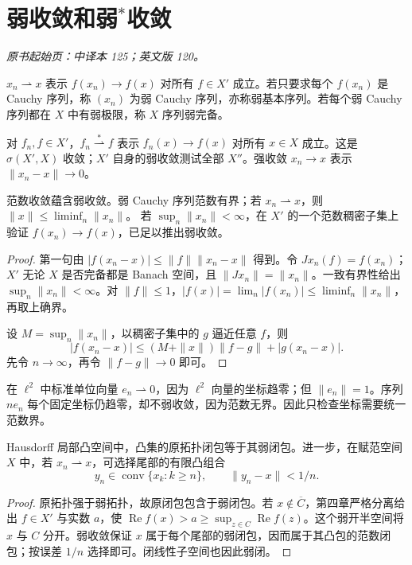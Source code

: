 \section{弱收敛和弱\texorpdfstring{$^*$}{*}收敛}\label{sec:yosida-05-01}
\noindent\textit{原书起始页：中译本 125；英文版 120。}

\begin{definition}[三种测试方式]
$x_n\rightharpoonup x$ 表示 $f(x_n)\to f(x)$ 对所有 $f\in X'$ 成立。若只要求每个 $f(x_n)$ 是 Cauchy 序列，称 $(x_n)$ 为弱 Cauchy 序列，亦称弱基本序列。若每个弱 Cauchy 序列都在 $X$ 中有弱极限，称 $X$ 序列弱完备。

对 $f_n,f\in X'$，$f_n\overset{*}{\rightharpoonup}f$ 表示 $f_n(x)\to f(x)$ 对所有 $x\in X$ 成立。这是 $\sigma(X',X)$ 收敛；$X'$ 自身的弱收敛测试全部 $X''$。强收敛 $x_n\to x$ 表示 $\|x_n-x\|\to0$。
\end{definition}

\begin{theorem}\label{thm:y5-weak-basic}
范数收敛蕴含弱收敛。弱 Cauchy 序列范数有界；若 $x_n\rightharpoonup x$，则 $\|x\|\le\liminf_n\|x_n\|$。
若 $\sup_n\|x_n\|<\infty$，在 $X'$ 的一个范数稠密子集上验证 $f(x_n)\to f(x)$，已足以推出弱收敛。
\end{theorem}
\begin{proof}
第一句由 $|f(x_n-x)|\le\|f\|\|x_n-x\|$ 得到。令 $Jx_n(f)=f(x_n)$；$X'$ 无论 $X$ 是否完备都是 Banach 空间，且 $\|Jx_n\|=\|x_n\|$。一致有界性给出 $\sup_n\|x_n\|<\infty$。对 $\|f\|\le1$，$|f(x)|=\lim_n|f(x_n)|\le\liminf_n\|x_n\|$，再取上确界。

设 $M=\sup_n\|x_n\|$，以稠密子集中的 $g$ 逼近任意 $f$，则
\[
 |f(x_n-x)|\le(M+\|x\|)\|f-g\|+|g(x_n-x)|.
\]
先令 $n\to\infty$，再令 $\|f-g\|\to0$ 即可。
\end{proof}

\begin{example}[坐标收敛与有界性]
在 $\ell^2$ 中标准单位向量 $e_n\rightharpoonup0$，因为 $\ell^2$ 向量的坐标趋零；但 $\|e_n\|=1$。序列 $ne_n$ 每个固定坐标仍趋零，却不弱收敛，因为范数无界。因此只检查坐标需要统一范数界。
\end{example}

\begin{theorem}\label{thm:y5-mazur}
Hausdorff 局部凸空间中，凸集的原拓扑闭包等于其弱闭包。进一步，在赋范空间 $X$ 中，若 $x_n\rightharpoonup x$，可选择尾部的有限凸组合
\[
 y_n\in\operatorname{conv}\{x_k:k\ge n\},\qquad \|y_n-x\|<1/n.
\]
\end{theorem}
\begin{proof}
原拓扑强于弱拓扑，故原闭包包含于弱闭包。若 $x\notin\overline C$，第四章严格分离给出 $f\in X'$ 与实数 $a$，使 $\operatorname{Re}f(x)>a\ge\sup_{z\in C}\operatorname{Re}f(z)$。这个弱开半空间将 $x$ 与 $C$ 分开。弱收敛保证 $x$ 属于每个尾部的弱闭包，因而属于其凸包的范数闭包；按误差 $1/n$ 选择即可。闭线性子空间也因此弱闭。
\end{proof}


